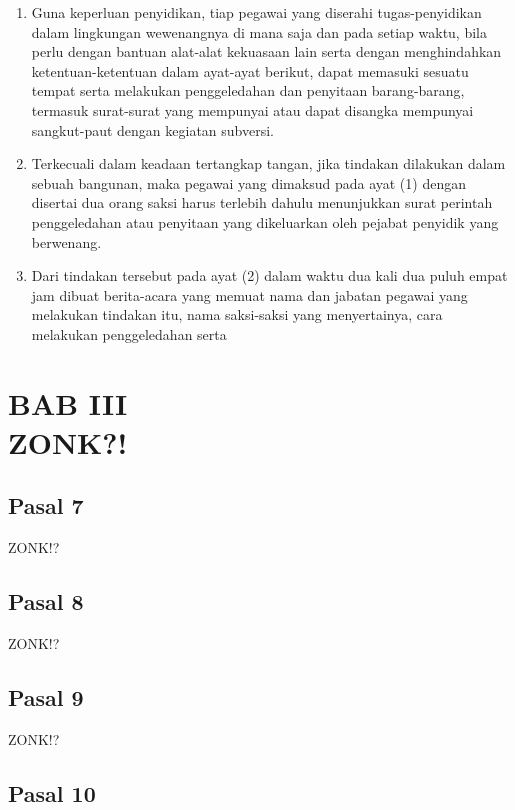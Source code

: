 \documentclass{article}
\begin{document}
\renewcommand{\labelenumi}{(\arabic{enumi}) }
\renewcommand{\labelenumii}{\alph{enumii}. }
\renewcommand{\labelenumiii}{\arabic{enumiii}. }
\begin{enumerate}
\item Guna keperluan penyidikan, tiap pegawai yang diserahi tugas-penyidikan dalam lingkungan
wewenangnya di mana saja dan pada setiap waktu, bila perlu dengan bantuan alat-alat kekuasaan
lain serta dengan menghindahkan ketentuan-ketentuan dalam ayat-ayat berikut, dapat memasuki
sesuatu tempat serta melakukan penggeledahan dan penyitaan barang-barang, termasuk surat-surat
yang mempunyai atau dapat disangka mempunyai sangkut-paut dengan kegiatan subversi.
\item Terkecuali dalam keadaan tertangkap tangan, jika tindakan dilakukan dalam sebuah bangunan, maka
pegawai yang dimaksud pada ayat (1) dengan disertai dua orang saksi harus terlebih dahulu
menunjukkan surat perintah penggeledahan atau penyitaan yang dikeluarkan oleh pejabat penyidik
yang berwenang.
\item Dari tindakan tersebut pada ayat (2) dalam waktu dua kali dua puluh empat jam dibuat berita-acara
yang memuat nama dan jabatan pegawai yang melakukan tindakan itu, nama saksi-saksi yang
menyertainya, cara melakukan penggeledahan serta
\end{enumerate}

\section*{\centering{}BAB III\\ZONK?!}

\subsection*{\centering{}Pasal 7}

ZONK!?

\subsection*{\centering{}Pasal 8}

ZONK!?

\subsection*{\centering{}Pasal 9}

ZONK!?

\subsection*{\centering{}Pasal 10}
\end{document}

